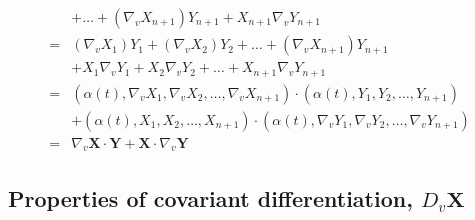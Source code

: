 \begin{enumerate}
\begin{align*}
		& + \dots + (\nabla_v X_{n+1})Y_{n+1} + X_{n+1}\nabla_v Y_{n+1}\\
		= & (\nabla_v X_1)Y_1 + (\nabla_v X_2)Y_2 + \dots + (\nabla_v X_{n+1})Y_{n+1} \\
		& + X_1\nabla_v Y_1 +X_2\nabla_v Y_2 + \dots + X_{n+1} \nabla_v Y_{n+1}\\
		= & (\alpha(t),\nabla_v X_1,\nabla_v X_2,\dots,\nabla_v X_{n+1}) \cdot (\alpha(t),Y_1,Y_2,\dots,Y_{n+1})\\
		& + (\alpha(t),X_1,X_2,\dots,X_{n+1}) \cdot (\alpha(t),\nabla_v Y_1,\nabla_v Y_2,\dots,\nabla_v Y_{n+1}) \\
		= & \nabla_v \mathbf{X} \cdot \mathbf{Y} + \mathbf{X} \cdot \nabla_v \mathbf{Y}
	\end{align*}
\end{enumerate}

\subsection{Properties of covariant differentiation, $D_v \mathbf{X}$}


